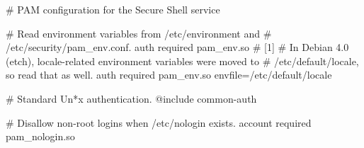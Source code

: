 \documentclass[mingoth,a4paper]{jsarticle}
\begin{document}
{{{{{{{

\begin{commandline}
# PAM configuration for the Secure Shell service

# Read environment variables from /etc/environment and
# /etc/security/pam_env.conf.
auth       required     pam_env.so # [1]
# In Debian 4.0 (etch), locale-related environment variables were moved to
# /etc/default/locale, so read that as well.
auth       required     pam_env.so envfile=/etc/default/locale

# Standard Un*x authentication.
@include common-auth

# Disallow non-root logins when /etc/nologin exists.
account    required     pam_nologin.so


\end{commandline}}}}}}}}
\end{document}
